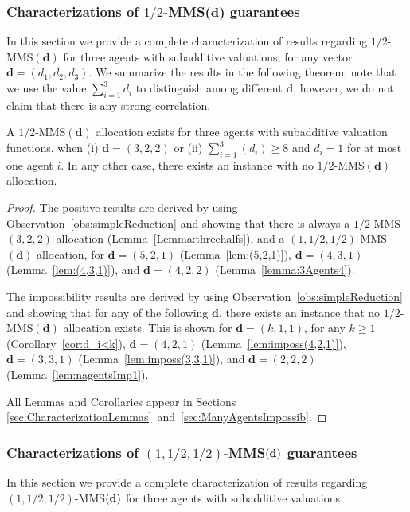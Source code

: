 \subsubsection{Characterizations of $1/2$-MMS($\mathbf{d}$) guarantees}
In this section we provide a complete characterization of results regarding $1/2$-MMS$(\mathbf{d})$ for three agents with subadditive valuations, for any vector $\mathbf{d}=(d_1,d_2,d_3)$. We summarize the results in the following theorem; note that we use the value $\sum_{i=1}^3d_i$ to distinguish among different $\mathbf{d}$, however, we do not claim that there is any strong correlation. 

\begin{theorem}\label{thm:three-general}
    A $1/2$-MMS$(\mathbf{d})$ allocation exists for three agents with subadditive valuation functions, when (i) $\mathbf{d}=(3,2,2)$ or (ii)  $\sum_{i=1}^3(d_i)\geq 8$ and $d_i=1$ for at most one agent $i$. In any other case, there exists an instance with no $1/2$-MMS$(\mathbf{d})$ allocation.
\end{theorem}
\begin{proof}
    The positive results are derived by using Observation~\ref{obs:simpleReduction} and showing that there is always a $1/2$-MMS$(3,2,2)$ allocation (Lemma~\ref{Lemma:threehalfs}), and a $(1,1/2,1/2)$-MMS$(\mathbf{d})$ allocation, for $\mathbf{d}=(5,2,1)$ (Lemma~\ref{lem:(5,2,1)}), $\mathbf{d}=(4,3,1)$ (Lemma~\ref{lem:(4,3,1)}), and $\mathbf{d}=(4,2,2)$  (Lemma~\ref{lemma:3Agents4}). 
    
    The impossibility results are derived by using Observation~\ref{obs:simpleReduction} and showing that for any of the following $\mathbf{d}$, there exists an instance that no $1/2$-MMS$(\mathbf{d})$ allocation exists. This is shown for $\mathbf{d}=(k,1,1)$, for any $k\geq 1$ (Corollary~\ref{cor:d_i<k}), $\mathbf{d}=(4,2,1)$ (Lemma~\ref{lem:imposs(4,2,1)}), $\mathbf{d}=(3,3,1)$ (Lemma~\ref{lem:imposs(3,3,1)}), and $\mathbf{d}=(2,2,2)$ (Lemma~\ref{lem:nagentsImp1}). 
    
    All Lemmas and Corollaries appear in Sections \ref{sec:CharacterizationLemmas}~and~\ref{sec:ManyAgentsImpossib}.
\end{proof}





\subsubsection{Characterizations of $(1,1/2,1/2)$-MMS$(\bf d)$ guarantees }
In this section we provide a complete characterization of results regarding $(1,1/2,1/2)$-MMS$(\bf d)$ for three agents with subadditive valuations.

